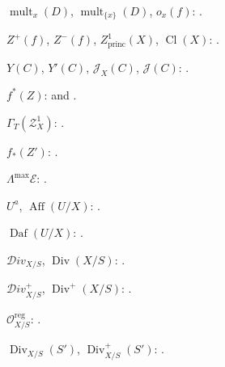 $\operatorname{mult}_x(D)$, $\operatorname{mult}_{\{x\}}(D)$,
$o_x(f)$: .

$Z^+(f)$, $Z^-(f)$, $Z^1_{\mathrm{princ}}(X)$,
$\operatorname{Cl}(X)$: .

$Y(C)$, $Y'(C)$, $\mathcal J_X(C)$, $\mathcal J(C)$:
.

$f^*(Z)$:  and .

$\Gamma_T(\mathcal Z_X^1)$: .

$f_*(Z')$: .

$\Lambda^{\max}\mathcal E$: .

$U^a$, $\operatorname{Aff}(U/X)$: .

$\operatorname{Daf}(U/X)$: .

$\mathcal{D}iv_{X/S}$, $\operatorname{Div}(X/S)$:
.

$\mathcal{D}iv_{X/S}^+$, $\operatorname{Div}^+(X/S)$:
.

$\mathcal O_{X/S}^{\mathrm{reg}}$: .

$\operatorname{Div}_{X/S}(S')$, $\operatorname{Div}_{X/S}^+(S')$:
.

\endgroup

